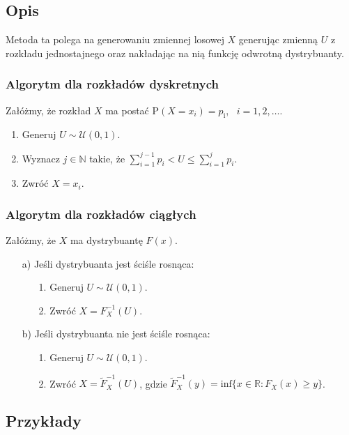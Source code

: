 \documentclass[12pt]{mwrep}
\begin{document}
	\subsection{Opis}
	\noindent Metoda ta polega na generowaniu zmiennej losowej $X$ generując zmienną $U$ z rozkładu jednostajnego oraz nakładając na nią funkcję odwrotną dystrybuanty.
	\subsubsection{Algorytm dla rozkładów dyskretnych}
	\noindent Załóżmy, że rozkład $X$ ma postać $\mathrm{P}(X = x_i) = p_\mathrm{i}$, \ $i = 1, 2,\dots $.
	\begin{enumerate}[leftmargin=10mm]
		\item Generuj $U \sim \mathcal{U}(0, 1)$.
		\item Wyznacz $j \in \mathbb{N} $ takie, że $ \sum\limits_{i=1}^{j-1} p_i < U \leqslant \sum\limits_{i=1}^{j} p_i $.
		\item Zwróć $ X = x_i $.
	\end{enumerate}
	\subsubsection{Algorytm dla rozkładów ciągłych}
	\noindent Załóżmy, że $X$ ma dystrybuantę $F(x)$.
	\begin{enumerate}[leftmargin=10mm]
		\item[a)] Jeśli dystrybuanta jest ściśle rosnąca:
		\begin{enumerate}
			\item[1.] Generuj $U \sim \mathcal{U}(0, 1)$.
			\item[2.] Zwróć $ X = F_X^{-1}(U) $.
		\end{enumerate}
		\item[b)] Jeśli dystrybuanta nie jest ściśle rosnąca:
		\begin{enumerate}
			\item[1.] Generuj $U \sim \mathcal{U}(0, 1)$.
			\item[2.] Zwróć $ X = \widetilde{F}_X^{-1}(U) $, gdzie $ \widetilde{F}_X^{-1}(y) = \mathrm{inf}\{x \in \mathbb{R}: F_X(x) \geqslant y\} $.
		\end{enumerate}
	\end{enumerate}

	\subsection{Przykłady}
	
\end{document}
